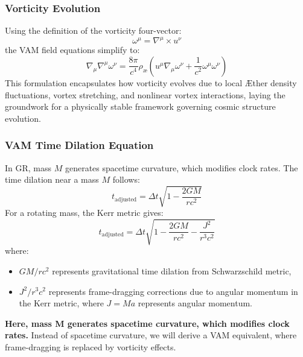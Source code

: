 \subsubsection*{Vorticity Evolution}
Using the definition of the vorticity four-vector:
\begin{equation}
    \omega^\mu = \nabla^\mu \times u^\nu
\end{equation}
the VAM field equations simplify to:
\begin{equation}
    \nabla_\mu \nabla^\mu \omega^\nu = \frac{8\pi}{c^4} \rho_{\text{\ae}} \left( u^\mu \nabla_\mu \omega^\nu + \frac{1}{c^2} \omega^\mu \omega^\nu \right)
\end{equation}
This formulation encapsulates how vorticity evolves due to local \AE ther density fluctuations, vortex stretching, and nonlinear vortex interactions, laying the groundwork for a physically stable framework governing cosmic structure evolution.

\subsubsection*{VAM Time Dilation Equation}
In GR, mass $M$ generates spacetime curvature, which modifies clock rates. The time dilation near a mass $M$ follows:
\begin{equation}
    t_{\text{adjusted}} = \Delta t \sqrt{1 - \frac{2GM}{rc^2}}
\end{equation}
For a rotating mass, the Kerr metric gives:
\begin{equation}
    t_{\text{adjusted}} = \Delta t \sqrt{1 - \frac{2GM}{r c^2} - \frac{J^2}{r^3 c^2}}
\end{equation}
where:
\begin{itemize}
    \item $GM/r c^2$ represents gravitational time dilation from Schwarzschild metric,
    \item $J^2/r^3 c^2$ represents frame-dragging corrections due to angular momentum in the Kerr metric, where $J = M a$ represents angular momentum.
\end{itemize}

\textbf{Here, mass M generates spacetime curvature, which modifies clock rates.}
Instead of spacetime curvature, we will derive a VAM equivalent, where frame-dragging is replaced by vorticity effects.

